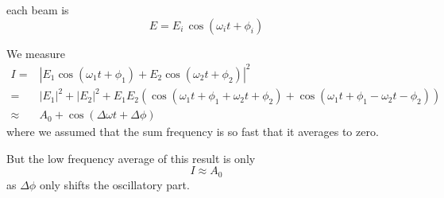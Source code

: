 \documentclass[11pt,a4paper]{article}
\begin{document}
each beam is
\begin{equation}
E = E_i \, \cos (\omega_i t + \phi_i)
\end{equation}

We measure
\begin{align}
 I = &  \left| E_1 \cos (\omega_1 t + \phi_1) + E_2 \cos (\omega_2 t + \phi_2) \right|^2 \\
  = & |E_1|^2 + |E_2|^2 
  + E_1 E_2 \left( \cos(\omega_1 t + \phi_1 + \omega_2 t + \phi_2) + 
  \cos(\omega_1 t + \phi_1 - \omega_2 t - \phi_2) \right) \\
  \approx & A_0 + \cos(\Delta\omega t + \Delta \phi) 
\end{align}
where we assumed that the sum frequency is so fast that it averages to zero.


But the low frequency average of this result is only
\begin{equation}
I \approx A_0
\end{equation}
as $\Delta \phi$ only shifts  the oscillatory part.
\end{document}

